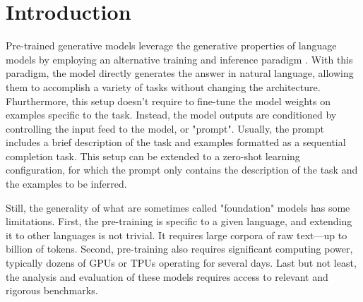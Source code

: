 

\section{Introduction}

Pre-trained generative models leverage the generative properties of language models by employing an alternative training and inference paradigm \parencite{radford_2018, radford_2019, brown_20}. With this paradigm, the model directly generates the answer in natural language, allowing them to accomplish a variety of tasks without changing the architecture. Fhurthermore, this setup doesn’t require to fine-tune the model weights on examples specific to the task. Instead, the model outputs are conditioned by controlling the input feed to the model, or "prompt". Usually, the prompt includes a brief description of the task and examples formatted as a sequential completion task. This setup can be extended to a zero-shot learning configuration, for which the prompt only contains the description of the task and the examples to be inferred.

Still, the generality of what are sometimes called "foundation" models has some limitations. First, the pre-training is specific to a given language, and extending it to other languages is not trivial. It requires large corpora of raw text—up to billion of tokens. Second, pre-training also requires significant computing power, typically dozens of GPUs or TPUs operating for several days. Last but not least, the analysis and evaluation of these models requires access to relevant and rigorous benchmarks.

